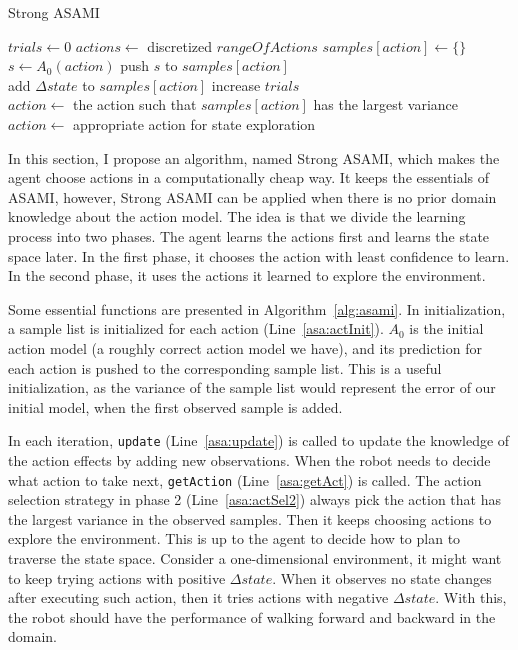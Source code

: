 \documentclass[12pt]{article}
\begin{document}
\begin{algorithm*}
\caption{Strong ASAMI}\label{alg:asami}
\begin{algorithmic}[1]
    \State $trials\gets 0$
    \State $actions \gets$ discretized $rangeOfActions$
        \State $samples[action] \gets \{\}$ \label{asa:actInit}
        \State $s \gets A_0(action)$
	\State push $s$ to $samples[action]$
    \EndFor
\EndFunction
\\
 \label{asa:update}
    \State add $\Delta state$ to $samples[action]$
    \State increase $trials$
\EndFunction
\\
 \label{asa:getAct}
        \State $action \gets$ the action such that $samples[action]$ has the largest variance
    \Else
        \State $action \gets$ appropriate action for state exploration \label{asa:actSel2}
    \EndIf
\EndFunction

\end{algorithmic}
\end{algorithm*}

In this section, I propose an algorithm, named Strong ASAMI,
which makes the agent choose actions in a computationally cheap way.
It keeps the essentials of ASAMI, however, Strong ASAMI can be applied
when there is no prior domain knowledge about the action model. The
idea is that we divide the learning process into two phases. The agent
learns the actions first and learns the state space later. In the
first phase, it chooses the action with least confidence to learn. In
the second phase, it uses the actions it learned to explore the
environment.

Some essential functions are presented in Algorithm~\ref{alg:asami}.
In initialization, a sample list is initialized for each action
(Line~\ref{asa:actInit}). $A_0$ is the initial action model (a roughly
correct action model we have), and its prediction for each action is
pushed to the corresponding sample list.  This is a useful
initialization, as the variance of the sample list would represent
the error of our initial model, when the first observed sample is
added.

In each iteration, \texttt{update} (Line~\ref{asa:update}) is called to update
the knowledge of the action effects by adding new observations. When
the robot needs to decide what action to take next,
\texttt{getAction} (Line~\ref{asa:getAct}) is called.
The action selection strategy in phase 2 (Line~\ref{asa:actSel2})
always pick the action that has the largest variance in the observed
samples. Then it keeps choosing actions to explore the environment.
This is up to the agent to decide how to plan to traverse
the state space. Consider a one-dimensional environment, it might want
to keep trying actions with positive $\Delta state$. When it observes
no state changes after executing such action, then it tries actions
with negative $\Delta state$. With this, the robot should have the
performance of walking forward and backward in the domain.
\end{document}
